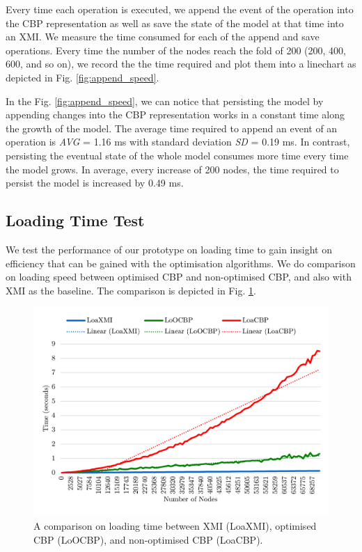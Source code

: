 \documentclass{llncs}
\begin{document}
Every time each operation is executed, we append the event of the operation into the CBP representation as well as save the state of the model at that time into an XMI. We measure the time consumed for each of the append and save operations. Every time the number of the nodes reach the fold of 200 (200, 400, 600, and so on), we record the the time required and plot them into a linechart as depicted in Fig. \ref{fig:append_speed}.

In the Fig. \ref{fig:append_speed}, we can notice that persisting the model by appending changes into the CBP representation works in a constant time along the growth of the model. The average time required to append an event of an operation is \emph{AVG} = 1.16 ms with standard deviation \emph{SD} = 0.19 ms. In contrast, persisting the eventual state of the whole model consumes more time every time the model grows. In average, every increase of 200 nodes, the time required to persist the model is increased by 0.49 ms. 

\subsection{Loading Time Test}
\label{subsec:loading_time_test}
We test the performance of our prototype on loading time to gain insight on efficiency that can be gained with the optimisation algorithms. We do comparison on loading speed between optimised CBP and non-optimised CBP, and also with XMI as the baseline. The  comparison is depicted in Fig. \ref{fig:loading_speed}.

\begin{figure}[ht]
\centering
\includegraphics[width=\linewidth]{loading_speed}
\caption{A comparison on loading time between XMI (LoaXMI), optimised CBP (LoOCBP), and non-optimised CBP (LoaCBP).}
\label{fig:loading_speed}
\end{figure}
\end{document}
